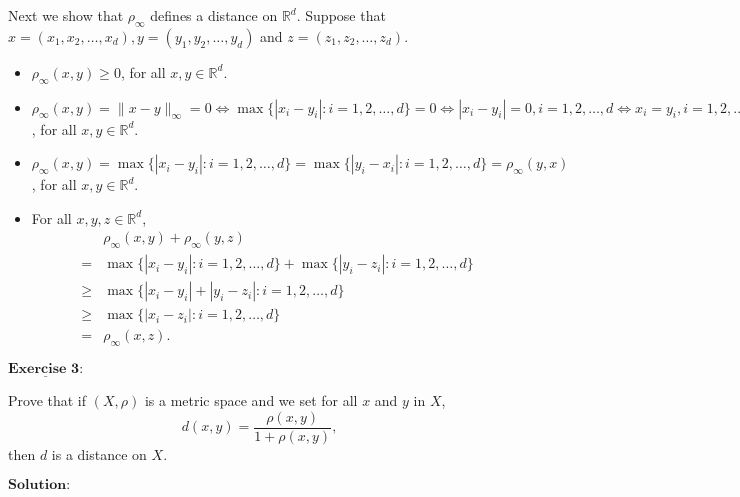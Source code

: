 \documentclass[12pt,a4paper]{ctexart}
\begin{document}
Next we show that $\rho_{\infty}$ defines a distance on $\mathbb R^d$. Suppose that $x = (x_1, x_2, \dots, x_d), y = (y_1, y_2, \dots, y_d)$ and $z = (z_1, z_2, \dots, z_d)$.
\begin{itemize}
    \item $\rho_{\infty}(x,y) \geq 0$, for all $x, y \in \mathbb R^d$.
    \item $\rho_{\infty}(x,y) = \|x - y\|_{\infty} = 0 \Leftrightarrow  \max \{ |x_i - y_i|: i = 1, 2, \dots, d \} = 0 \Leftrightarrow |x_i - y_i| = 0, i = 1, 2, \dots, d \Leftrightarrow x_i = y_i, i = 1, 2, \dots, d \Leftrightarrow x = y$, for all $x, y \in \mathbb R^d$.
    \item $\rho_{\infty}(x,y) = \max \{ |x_i - y_i|: i =1, 2, \dots, d \} = \max \{ |y_i - x_i|: i =1, 2, \dots, d \} = \rho_{\infty}(y,x)$, for all $x, y \in \mathbb R^d$. 
    \item For all $x, y, z\in \mathbb R^d$,
    \begin{eqnarray*}
    & & \rho_{\infty}(x, y) + \rho_{\infty}(y, z) \\
    & = & \max \{ |x_i - y_i|: i =1, 2, \dots, d \} + \max \{ |y_i - z_i|: i =1, 2, \dots, d \}  \\
    & \geq & \max \{ |x_i - y_i| + |y_i - z_i| : i =1, 2, \dots, d \} \\
    & \geq & \max \{ |x_i - z_i|: i =1, 2, \dots, d \}  \\
    & = & \rho_{\infty}(x, z).
\end{eqnarray*}
\end{itemize}


\newpage 

$\underline{\textbf{Exercise 3:}}$

Prove that if $(X, \rho)$ is a metric space and we set for all $x$ and $y$ in $X$,
$$d(x, y) = \frac{\rho(x,y)}{1 + \rho(x,y)},$$
then $d$ is a distance on $X$.

\vspace{8pt}
$\textbf{Solution:}$
\end{document}
